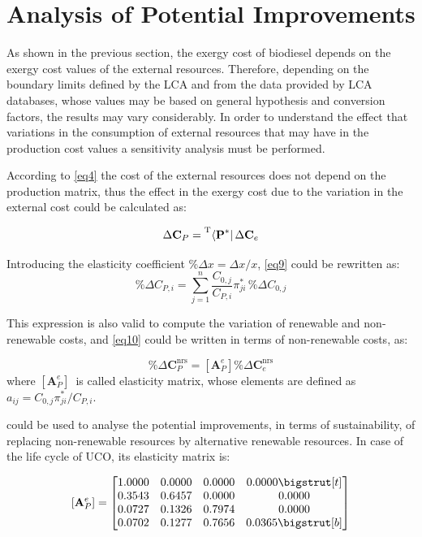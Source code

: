\documentclass[sustainability,article,submit,moreauthors,pdftex,12pt,a4paper]{mdpi}
\newcommand{\tmopcr}[1]{\ensuremath{\prescript{\mathrm{T}}{}{\left\langle {\textbf{#1}^\ast } \right|}}}
\newcommand{\vm}[1]{\ensuremath{\mathbf{#1}}}
\newcommand{\vms}[3][\phantom{\ast}]{\ensuremath{\mathbf{#2}_{#3}^\mathrm{#1}}}
\newcommand{\elm}{\ensuremath{\left[\vm{A}_P^e\right]}}
\begin{document}
\FloatBarrier

\section{Analysis of Potential Improvements}

As shown in the previous section, the exergy cost of biodiesel depends on the exergy cost values of the external resources. Therefore, depending on the boundary limits defined by the LCA and from the data provided by LCA databases, whose values may be based on general hypothesis and conversion factors, the results may vary considerably. In order to understand the effect that variations in the consumption of external resources that may have in the production cost values a sensitivity analysis must be performed.

According to \cref{eq4} the cost of the external resources does not depend on the production matrix, thus the effect in the exergy cost due to the variation in the external cost could be calculated as:

\begin{equation}
 \Delta \vm{C}_P =\tmopcr{P} \, \Delta\vm{C}_e
 \label{eq9}
\end{equation}

Introducing the elasticity coefficient $\%\Delta x = \Delta x / x$, \cref{eq9} could be rewritten as:
\begin{equation}
\%\Delta C_{P,i}=\sum\limits_{j=1}^{n}{\frac{C_{0,j}}{C_{P,i}}\pi_{ji}^{\ast}}\,\%\Delta C_{0,j}
\label{eq10}
\end{equation}

This expression is also valid to compute the variation of renewable and non-renewable costs, and
\cref{eq10} could be written in terms of non-renewable costs, as:

\begin{equation}
\label{eq11}
\%\Delta \vms[nrs]{C}{P}= \elm \% \Delta \vms[nrs]{C}{e}
\end{equation}
\noindent where \elm~is called elasticity matrix, whose elements are defined as $a_{ij}=C_{0,j}\pi_{ji}^*/C_{P,i}$. 

 could be used to analyse the potential improvements, in terms of sustainability, of replacing non-renewable resources by alternative renewable resources. In case of the life cycle of UCO, its elasticity matrix is:

\[
\elm=\begin{bmatrix} 
1.0000 & 0.0000 & 0.0000 & 0.0000 \bigstrut[t]\\
0.3543 & 0.6457 & 0.0000 & 0.0000 \\
0.0727 & 0.1326 & 0.7974 & 0.0000 \\
0.0702 & 0.1277 & 0.7656 & 0.0365 \bigstrut[b]\\
\end{bmatrix}
\]
\end{document}
